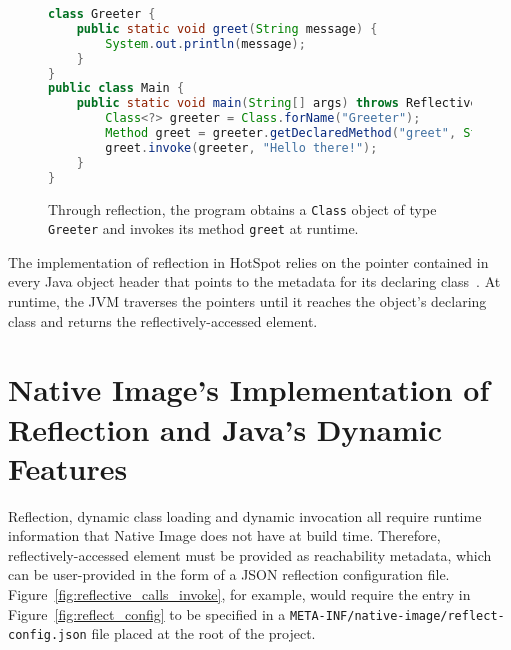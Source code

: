 \begin{figure}[ht]
    \centering
\begin{lstlisting}[language=Java]
class Greeter {
    public static void greet(String message) { 
        System.out.println(message); 
    }
}
public class Main {
    public static void main(String[] args) throws ReflectiveOperationException {
        Class<?> greeter = Class.forName("Greeter");
        Method greet = greeter.getDeclaredMethod("greet", String.class);
        greet.invoke(greeter, "Hello there!");
    }   
}
\end{lstlisting}
    \caption{Through reflection, the program obtains a \texttt{Class} object of type \texttt{Greeter} and invokes its method \texttt{greet} at runtime.}
    \label{fig:reflective_calls}
\end{figure}

The implementation of reflection in HotSpot relies on the pointer contained in every Java object header that points to the metadata for its declaring class~\cite{evans_ben_reflection_nodate}. At runtime, the JVM traverses the pointers until it reaches the object's declaring class and returns the reflectively-accessed element.

\section{Native Image's Implementation of Reflection and Java's Dynamic Features}
Reflection, dynamic class loading and dynamic invocation all require runtime information that Native Image does not have at build time. Therefore, reflectively-accessed element must be provided as reachability metadata, which can be user-provided in the form of a JSON reflection configuration file.  
Figure~\ref{fig:reflective_calls_invoke}, for example, would require the entry in Figure~\ref{fig:reflect_config} to be specified in a \verb|META-INF/native-image/reflect-config.json| file placed at the root of the project.

